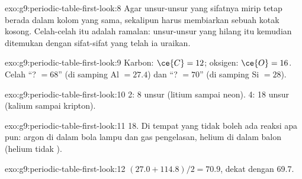 \begin{solution}{exo:g9:periodic-table-first-look:8}
Agar unsur-unsur yang sifatnya mirip tetap berada dalam kolom yang
sama, sekalipun harus membiarkan sebuah kotak kosong. Celah-celah itu
adalah ramalan: unsur-unsur yang hilang itu kemudian ditemukan dengan
sifat-sifat yang telah ia uraikan.
\end{solution}

\begin{solution}{exo:g9:periodic-table-first-look:9}
Karbon: $\ce{C} = 12$; oksigen: $\ce{O} = 16$. Celah ``? $= 68$'' (di
samping Al $= 27.4$) dan ``? $= 70$'' (di samping Si $= 28$).
\end{solution}

\begin{solution}{exo:g9:periodic-table-first-look:10}
 2: 8 unsur (litium sampai neon).  4: 18 unsur (kalium
sampai kripton).
\end{solution}

\begin{solution}{exo:g9:periodic-table-first-look:11}
 18. Di tempat yang tidak boleh ada reaksi apa pun: argon di
dalam bola lampu dan gas pengelasan, helium di dalam balon (helium tidak
).
\end{solution}

\begin{solution}{exo:g9:periodic-table-first-look:12}
$(27.0 + 114.8)/2 = 70.9$, dekat dengan 69.7.
\end{solution}

